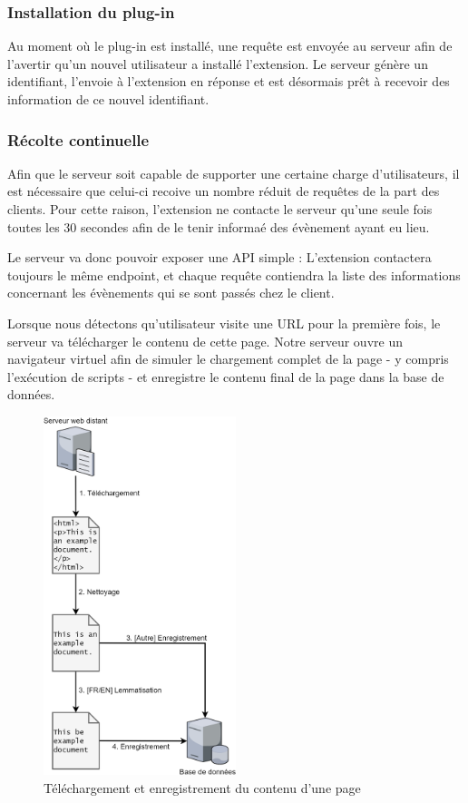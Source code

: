 		\subsubsection{Installation du plug-in}

			Au moment où le plug-in est installé, une requête est envoyée au serveur afin de l'avertir qu'un nouvel utilisateur a installé l'extension. Le serveur génère un identifiant, l'envoie à l'extension en réponse et est désormais prêt à recevoir des information de ce nouvel identifiant.

		\subsubsection{Récolte continuelle\label{d-recolte}}

			Afin que le serveur soit capable de supporter une certaine charge d'utilisateurs, il est nécessaire que celui-ci recoive un nombre réduit de requêtes de la part des clients. Pour cette raison, l'extension ne contacte le serveur qu'une seule fois toutes les 30 secondes afin de le tenir informaé des évènement ayant eu lieu.

			Le serveur va donc pouvoir exposer une API simple : L'extension contactera toujours le même endpoint, et chaque requête contiendra la liste des informations concernant les évènements qui se sont passés chez le client.

			Lorsque nous détectons qu'utilisateur visite une URL pour la première fois, le serveur va télécharger le contenu de cette page. Notre serveur ouvre un navigateur virtuel afin de simuler le chargement complet de la page - y compris l'exécution de scripts - et enregistre le contenu final de la page dans la base de données.

			\begin{figure}[!h]
				\centering
				\includegraphics[width=0.5\textwidth]{images/design/data1_big}
				\caption{Téléchargement et enregistrement du contenu d'une page}
				\label{d-download-page}
			\end{figure}

